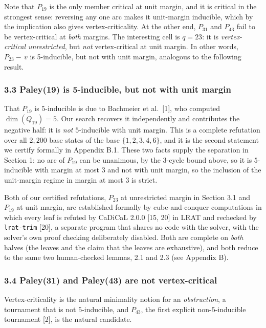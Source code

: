 \documentclass[
]{article}
\begin{document}
Note that \(P_{19}\) is the only member critical at unit margin, and it
is critical in the strongest sense: reversing any one arc makes it
unit-margin inducible, which by the implication also gives
vertex-criticality. At the other end, \(P_{31}\) and \(P_{43}\) fail to
be vertex-critical at \emph{both} margins. The interesting cell is
\(q = 23\): it is \emph{vertex-critical unrestricted}, but \emph{not}
vertex-critical at unit margin. In other words, \(P_{23} -\,v\) is
5-inducible, but not with unit margin, analogous to the following
result.

\subsubsection{3.3 Paley(19) is 5-inducible, but not with unit
margin}\label{paley19-is-5-inducible-but-not-with-unit-margin}

That \(P_{19}\) is \(5\)-inducible is due to Bachmeier et al.~{[}1{]},
who computed \(\dim(Q_{19}) = 5\). Our search recovers it independently
and contributes the negative half: it is \emph{not} \(5\)-inducible with
unit margin. This is a complete refutation over all \(2{,}200\) base
states of the base \(\{1,2,3,4,6\}\), and it is the second statement we
certify formally in Appendix B.1. These two facts supply the separation
in Section 1: no arc of \(P_{19}\) can be unanimous, by the \(3\)-cycle
bound above, so it is \(5\)-inducible with margin at most \(3\) and not
with unit margin, so the inclusion of the unit-margin regime in margin
at most \(3\) is strict.

Both of our certified refutations, \(P_{23}\) at unrestricted margin in
Section 3.1 and \(P_{19}\) at unit margin, are established formally by
cube-and-conquer computations in which every leaf is refuted by CaDiCaL
2.0.0 {[}15, 20{]} in LRAT and rechecked by \texttt{lrat-trim} {[}20{]},
a separate program that shares no code with the solver, with the
solver's own proof checking deliberately disabled. Both are complete on
\emph{both} halves (the leaves and the claim that the leaves are
exhaustive), and both reduce to the same two human-checked lemmas, 2.1
and 2.3 (see Appendix B).

\subsubsection{3.4 Paley(31) and Paley(43) are not
vertex-critical}\label{paley31-and-paley43-are-not-vertex-critical}

Vertex-criticality is the natural minimality notion for an
\emph{obstruction}, a tournament that is not \(5\)-inducible, and
\(P_{43}\), the first explicit non-\(5\)-inducible tournament {[}2{]},
is the natural candidate.
\end{document}
